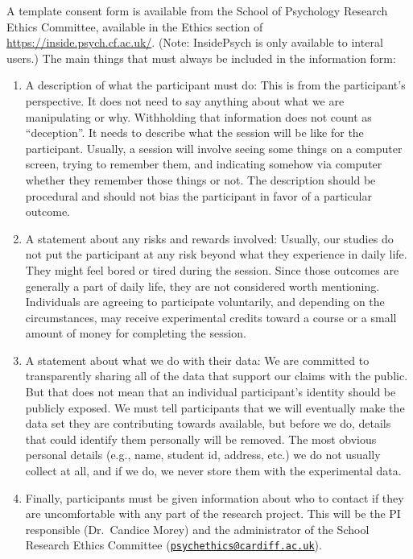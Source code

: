 \documentclass[
  12pt,
]{book}
\begin{document}
A template consent form is available from the School of Psychology Research Ethics Committee, available in the Ethics section of \url{https://inside.psych.cf.ac.uk/}. (Note: InsidePsych is only available to interal users.) The main things that must always be included in the information form:

\begin{enumerate}
\def\labelenumi{\arabic{enumi}.}
\item
  A description of what the participant must do: This is from the participant's perspective. It does not need to say anything about what we are manipulating or why. Withholding that information does not count as ``deception''. It needs to describe what the session will be like for the participant. Usually, a session will involve seeing some things on a computer screen, trying to remember them, and indicating somehow via computer whether they remember those things or not. The description should be procedural and should not bias the participant in favor of a particular outcome.
\item
  A statement about any risks and rewards involved: Usually, our studies do not put the participant at any risk beyond what they experience in daily life. They might feel bored or tired during the session. Since those outcomes are generally a part of daily life, they are not considered worth mentioning. Individuals are agreeing to participate voluntarily, and depending on the circumstances, may receive experimental credits toward a course or a small amount of money for completing the session.
\item
  A statement about what we do with their data: We are committed to transparently sharing all of the data that support our claims with the public. But that does not mean that an individual participant's identity should be publicly exposed. We must tell participants that we will eventually make the data set they are contributing towards available, but before we do, details that could identify them personally will be removed. The most obvious personal details (e.g., name, student id, address, etc.) we do not usually collect at all, and if we do, we never store them with the experimental data.
\item
  Finally, participants must be given information about who to contact if they are uncomfortable with any part of the research project. This will be the PI responsible (Dr.~Candice Morey) and the administrator of the School Research Ethics Committee (\href{mailto:psychethics@cardiff.ac.uk}{\nolinkurl{psychethics@cardiff.ac.uk}}).
\end{enumerate}
\end{document}
